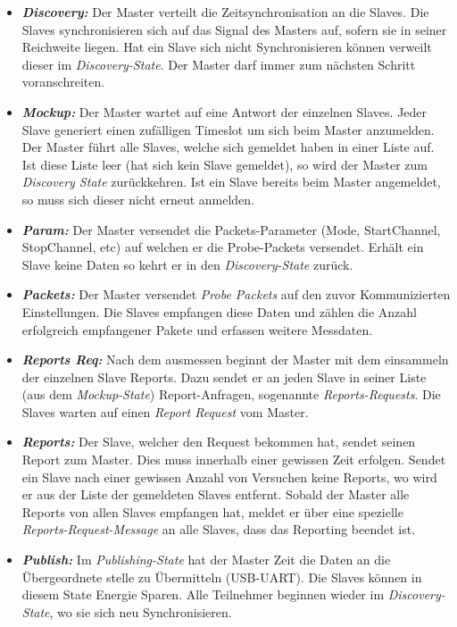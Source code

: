 \begin{itemize}
	\item \textbf{\textit{Discovery:}} Der Master verteilt die Zeitsynchronisation an die Slaves. Die Slaves synchronisieren sich auf das Signal des Masters auf, sofern sie in seiner Reichweite liegen. Hat ein Slave sich nicht Synchronisieren können verweilt dieser im \textit{Discovery-State}. Der Master darf immer zum nächsten Schritt voranschreiten. 
	\item \textbf{\textit{Mockup:}} Der Master wartet auf eine Antwort der einzelnen Slaves. Jeder Slave generiert einen zufälligen Timeslot um sich beim Master anzumelden. Der Master führt alle Slaves, welche sich gemeldet haben in einer Liste auf. Ist diese Liste leer (hat sich kein Slave gemeldet), so wird der Master zum \textit{Discovery State} zurückkehren. Ist ein Slave bereits beim Master angemeldet, so muss sich dieser nicht erneut anmelden. 
	\item \textbf{\textit{Param:}} Der Master versendet die Packets-Parameter (Mode, StartChannel, StopChannel, etc) auf welchen er die Probe-Packets versendet. Erhält ein Slave keine Daten so kehrt er in den \textit{Discovery-State} zurück. 
	\item \textbf{\textit{Packets:}} Der Master versendet \textit{Probe Packets} auf den zuvor Kommunizierten Einstellungen. Die Slaves empfangen diese Daten und zählen die Anzahl erfolgreich empfangener Pakete und erfassen weitere Messdaten. 
	\item  \textbf{\textit{Reports Req:}} Nach dem ausmessen beginnt der Master mit dem einsammeln der einzelnen Slave Reports. Dazu sendet er an jeden Slave in seiner Liste (aus dem \textit{Mockup-State}) Report-Anfragen, sogenannte \textit{Reports-Requests}. Die Slaves warten auf einen \textit{Report Request} vom Master. 
	\item  \textbf{\textit{Reports:}} Der Slave, welcher den Request bekommen hat, sendet seinen Report zum Master. Dies muss innerhalb einer gewissen Zeit erfolgen. Sendet ein Slave nach einer gewissen Anzahl von Versuchen keine Reports, wo wird er aus der Liste der gemeldeten Slaves entfernt. Sobald der Master alle Reports von allen Slaves empfangen hat, meldet er über eine spezielle \textit{Reports-Request-Message} an alle Slaves, dass das Reporting beendet ist.
	\item  \textbf{\textit{Publish:}} Im \textit{Publishing-State} hat der Master Zeit die Daten an die Übergeordnete stelle zu Übermitteln (USB-UART). Die Slaves können in diesem State Energie Sparen. Alle Teilnehmer beginnen wieder im \textit{Discovery-State}, wo sie sich neu Synchronisieren. 
\end{itemize}





